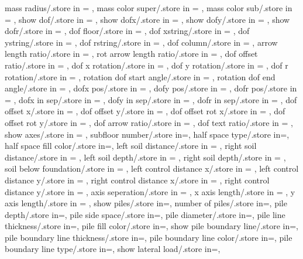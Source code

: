 {  mass radius/.store in = \massrad,
  mass color super/.store in = \masscolorsuper,
  mass color sub/.store in = \masscolorsub,
  show dof/.store in = \showdof,
  show dofx/.store in = \shodofx,
  show dofy/.store in = \shodofy,
  show dofr/.store in = \shodofr,
  dof floor/.store in = \doflocfloor,
  dof xstring/.store in = \dofxstr,
  dof ystring/.store in = \dofystr,
  dof rstring/.store in = \dofrstr,
  dof column/.store in = \dofloccolumn,
  arrow length ratio/.store in = \arrowlenratio,
  rot arrow length ratio/.store in = \rotarrowlenratio,
  dof offset ratio/.store in = \dofoffsetratio,
  dof x rotation/.store in = \dofxrotation,
  dof y rotation/.store in = \dofyrotation,
  dof r rotation/.store in = \dofrrotation,
  rotation dof start angle/.store in = \rotdofstartangle,
  rotation dof end angle/.store in = \rotdofendangle,
  dofx pos/.store in = \dofposx,
  dofy pos/.store in = \dofposy,
  dofr pos/.store in = \dofposr,
  dofx in sep/.store in = \dofinnersepx,
  dofy in sep/.store in = \dofinnersepy,
  dofr in sep/.store in = \dofinnersepr,
  dof offset x/.store in = \dofoffsetx,
  dof offset y/.store in = \dofoffsety,
  dof offset rot x/.store in = \dofrotoffsetx,  
  dof offset rot y/.store in = \dofrotoffsety,
  dof arrow ratio/.store in = \dofarrowratio,
  dof text ratio/.store in = \doftextratio,
  show axes/.store in = \showaxes,
  subfloor number/.store in=\subfloors,
  half space type/.store in=\halfspacetype,
  half space fill color/.store in=\halfspacefillcolor,
  left soil distance/.store in = \leftsoildist,
  right soil distance/.store in = \rightsoildist,
  left soil depth/.store in = \leftsoildepth,
  right soil depth/.store in = \rightsoildepth,
  soil below foundation/.store in = \soilbelowfound,
  left control distance x/.store in = \leftcontrolx,
  left control distance y/.store in = \leftcontroly,
  right control distance x/.store in = \rightcontrolx,
  right control distance y/.store in = \rightcontroly,
  axis seperation/.store in = \axisseperation,
  x axis length/.store in = \axeslenX,
  y axis length/.store in = \axeslenY,
  show piles/.store in=\showpiles,
  number of piles/.store in=\numberofpiles,
  pile depth/.store in=\piledepth,
  pile side space/.store in=\pilesidespace,
  pile diameter/.store in=\pilediameter,
  pile line thickness/.store in=\pilelinethickness,
  pile fill color/.store in=\pilefillcolor,
  show pile boundary line/.store in=\showpbline,
  pile boundary line thickness/.store in=\pblinet,
  pile boundary line color/.store in=\pblinecolor,
  pile boundary line type/.store in=\pblinetype,
  show lateral load/.store in=\showlatload,
}
